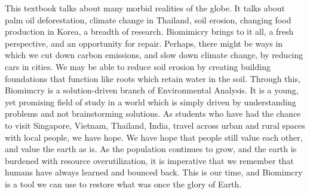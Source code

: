 This textbook talks about many morbid realities of the globe. It talks about palm oil deforestation, climate change in Thailand, soil erosion, changing food production in Korea, a breadth of research. Biomimicry brings to it all, a fresh perspective, and an opportunity for repair. Perhaps, there might be ways in which we cut down carbon emissions, and slow down climate change, by reducing cars in cities. We may be able to reduce soil erosion by creating building foundations that function like roots which retain water in the soil. Through this, Biomimcry is a solution-driven branch of Environmental Analysis. It is a young, yet promising field of study in a world which is simply driven by understanding problems and not brainstorming solutions. As students who have had the chance to visit Singapore, Vietnam, Thailand, India, travel across urban and rural spaces with local people, we have hope. We have hope that people still value each other, and value the earth as is. As the population continues to grow, and the earth is burdened with resource overutilization, it is imperative that we remember that humans have always learned and bounced back. This is our time, and Biomimcry is a tool we can use to restore what was once the glory of Earth.


\citep{benyus1997biomimicry}


\citet{china_ecovillage}

